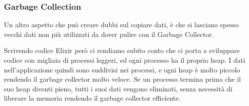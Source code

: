 \subsubsection{Garbage Collection}
Un altro aspetto che può creare dubbi sul copiare dati, è che
si lasciano spesso vecchi dati non più utilizzati da dover
pulire con il Garbage Collector.

Scrivendo codice Elixir però ci rendiamo subito conto
che ci porta a sviluppare codice con migliaia di processi leggeri,
ed ogni processo ha il proprio heap. I dati nell'applicazione quindi
sono suddivisi nei processi, e ogni heap è molto piccolo rendendo
il garbage collector molto veloce. Se un processo termina prima che
il suo heap diventi pieno, tutti i suoi dati vengono eliminati, senza necessità
di liberare la memoria rendendo il garbage collector
efficiente. \cite{programming_elixir_immutability}

